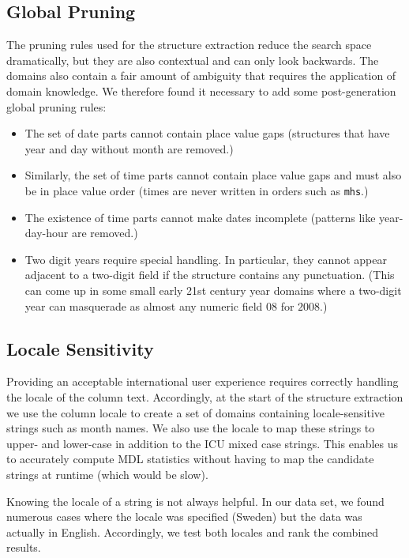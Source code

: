 \subsection{Global Pruning}
The pruning rules used for the structure extraction reduce the search space dramatically, but they are also contextual and can only look backwards. The domains also contain a fair amount of ambiguity that requires the application of domain knowledge. We therefore found it necessary to add some post-generation global pruning rules:
\begin{itemize}
\setlength\itemsep{0em}
\item The set of date parts cannot contain place value gaps (\eg structures that have year and day without month are removed.)
\item Similarly, the set of time parts cannot contain place value gaps and must also be in place value order (times are never written in orders such as \texttt{mhs}.)
\item The existence of time parts cannot make dates incomplete (\eg patterns like year-day-hour are removed.)
\item Two digit years require special handling. In particular, they cannot appear adjacent to a two-digit field if the structure contains any punctuation. (This can come up in some small early 21st century year domains where a two-digit year can masquerade as almost any numeric field \eg $08$ for $2008$.)
\end{itemize}


\subsection{Locale Sensitivity}
Providing an acceptable international user experience requires correctly handling the locale of the column text. Accordingly, at the start of the structure extraction we use the column locale to create a set of domains containing locale-sensitive strings such as month names. We also use the locale to map these strings to upper- and lower-case in addition to the ICU mixed case strings. This enables us to accurately compute MDL statistics without having to map the candidate strings at runtime (which would be slow).

Knowing the locale of a string is not always helpful. In our data set, we found numerous cases where the locale was specified (\eg Sweden) but the data was actually in English. Accordingly, we test both locales and rank the combined results. 

